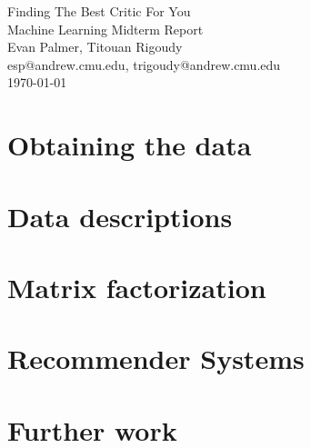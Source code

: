 \documentclass[12pt]{article}
\makeatletter
\newcommand{\myname}{Evan Palmer, Titouan Rigoudy}
\newcommand{\myandrew}{esp@andrew.cmu.edu, trigoudy@andrew.cmu.edu}
\newcommand{\thedate}{\today}
\makeatother
\begin{document}
	\medskip    
	\thispagestyle{plain}
	\begin{center}                 
	{\LARGE Finding The Best Critic For You} \\
	\medskip
	Machine Learning Midterm Report \\
	\smallskip
	\myname \\
	\myandrew \\
	\thedate \\
	\end{center}
	\vspace{0.5cm}


\section{Obtaining the data}

\section{Data descriptions}

\section{Matrix factorization}

\section{Recommender Systems}

\section{Further work}
\end{document}
